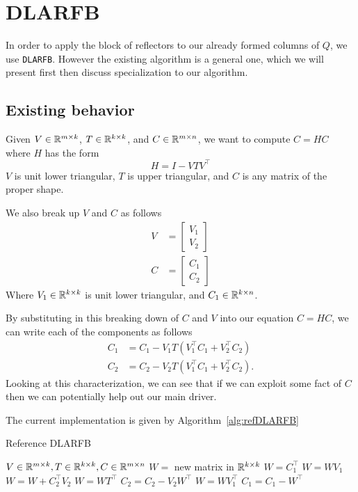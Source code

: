 \documentclass[12pt]{article}
\begin{document}
    \section{DLARFB}
    In order to apply the block of reflectors to our already formed columns of $Q$, we use \verb|DLARFB|.
    However the existing algorithm is a general one, which we will present first then discuss 
    specialization to our algorithm.
    \subsection{Existing behavior}
        Given $V\in\mathbb{R}^{m\times k}$, $T\in\mathbb{R}^{k\times k}$, and $C\in\mathbb{R}^{m\times n}$, we 
        want to compute $C = HC$ where $H$ has the form
        $$
        H = I - VTV^\top
        $$
        $V$ is unit lower triangular, $T$ is upper triangular, and $C$ is any matrix of the proper shape. 

        We also break up $V$ and $C$ as follows
        \begin{align}
            V &= \begin{bmatrix} V_1 \\ V_2 \end{bmatrix} \label{eq:vMatVert} \\
            C &= \begin{bmatrix} C_1 \\ C_2 \end{bmatrix} \label{eq:cMatVert}
        \end{align}
        Where $V_1\in\mathbb{R}^{k\times k}$ is unit lower triangular, and $C_1\in\mathbb{R}^{k\times n}$.

        By substituting in this breaking down of $C$ and $V$ into our equation $C = HC$, we can write each of the
        components as follows
        \begin{align*}
            C_1 &= C_1 - V_1T\left(V_1^\top C_1 + V_2^\top C_2\right) \\
            C_2 &= C_2 - V_2T\left(V_1^\top C_1 + V_2^\top C_2\right).
        \end{align*}
        Looking at this characterization, we can see that if we can exploit some fact of $C$ then we 
        can potentially help out our main driver.

        The current implementation is given by Algorithm~\ref{alg:refDLARFB}
        \begin{algorithm}
            \caption{Reference DLARFB}\label{alg:refDLARFB}
            \begin{algorithmic}[1]
                \REQUIRE $V\in\mathbb{R}^{m\times k}, T\in\mathbb{R}^{k\times k}, C\in\mathbb{R}^{m\times n}$
                \STATE $W = $ new matrix in $\mathbb{R}^{k\times k}$
                \STATE $W = C_1^\top$
                \STATE $W = WV_1$
                \STATE $W = W + C_2^\top V_2$
                \STATE $W = WT^\top$
                \STATE $C_2 = C_2 - V_2W^\top$
                \STATE $W = WV_1^\top$
                \STATE $C_1 = C_1 - W^\top$
            \end{algorithmic}
        \end{algorithm}
        
\end{document}

